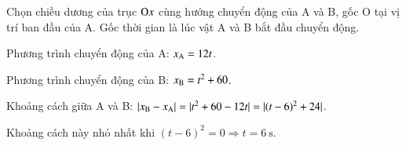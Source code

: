 \begin{enumerate}[label=\bfseries Bài \arabic*:,leftmargin=1.5cm]
\hideall
{Chọn chiều dương của trục $\text O x$ cùng hướng chuyển động của A và B, gốc O tại vị trí ban đầu của A. Gốc thời gian là lúc vật A và B bắt đầu chuyển động.
	
	Phương trình chuyển động của A: $x_\text A = 12t$.
	
	Phương trình chuyển động của B: $x_\text B = t^2 + 60$.
	
	Khoảng cách giữa A và B: $|x_\text B - x_\text A |=|t^2+60-12t|=|(t-6)^2+24|$.
	
	Khoảng cách này nhỏ nhất khi $(t-6)^2 = 0 \Rightarrow t=\SI{6}{\second}$.
}
\end{enumerate}

